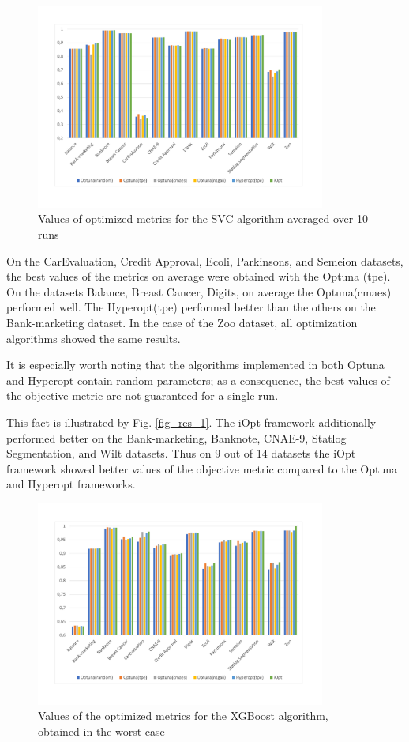 \documentclass[preprint,12pt]{elsarticle}
\begin{document}
\begin{figure}
\centering
\includegraphics[width=0.85\textwidth]{SVC_2_avg.pdf}
\caption{Values of optimized metrics for the SVC algorithm averaged over 10 runs} \label{fig_res_2}
\end{figure}


On the CarEvaluation, Credit Approval, Ecoli, Parkinsons, and Semeion datasets, the best values of the metrics on average were obtained with the Optuna (tpe). On the datasets Balance, Breast Cancer, Digits, on average the Optuna(cmaes) performed well. The Hyperopt(tpe) performed better than the others on the Bank-marketing dataset. In the case of the Zoo dataset, all optimization algorithms showed the same results.

It is especially worth noting that the algorithms implemented in both Optuna and Hyperopt contain random parameters; as a consequence, the best values of the objective metric are not guaranteed for a single run. 

This fact is illustrated by Fig. \ref{fig_res_1}. The iOpt framework additionally performed better on the Bank-marketing, Banknote, CNAE-9, Statlog Segmentation, and Wilt datasets. Thus on 9 out of 14 datasets the iOpt framework showed better values of the objective metric compared to the Optuna and Hyperopt frameworks.


\begin{figure}
\centering
\includegraphics[width=0.85\textwidth]{XGBoost_1.pdf}
\caption{Values of the optimized metrics for the XGBoost algorithm, obtained in the worst case} \label{fig_res_3}
\end{figure}
\end{document}
